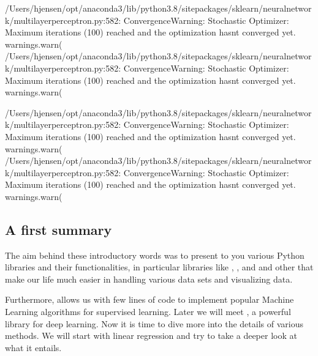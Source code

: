 \documentclass[letterpaper,10pt,english]{sphinxmanual}
\begin{document}
\begin{sphinxVerbatim}[commandchars=\\\{\}]
/Users/hjensen/opt/anaconda3/lib/python3.8/site\PYGZhy{}packages/sklearn/neural\PYGZus{}network/\PYGZus{}multilayer\PYGZus{}perceptron.py:582: ConvergenceWarning: Stochastic Optimizer: Maximum iterations (100) reached and the optimization hasn\PYGZsq{}t converged yet.
  warnings.warn(
/Users/hjensen/opt/anaconda3/lib/python3.8/site\PYGZhy{}packages/sklearn/neural\PYGZus{}network/\PYGZus{}multilayer\PYGZus{}perceptron.py:582: ConvergenceWarning: Stochastic Optimizer: Maximum iterations (100) reached and the optimization hasn\PYGZsq{}t converged yet.
  warnings.warn(
\end{sphinxVerbatim}

\begin{sphinxVerbatim}[commandchars=\\\{\}]
/Users/hjensen/opt/anaconda3/lib/python3.8/site\PYGZhy{}packages/sklearn/neural\PYGZus{}network/\PYGZus{}multilayer\PYGZus{}perceptron.py:582: ConvergenceWarning: Stochastic Optimizer: Maximum iterations (100) reached and the optimization hasn\PYGZsq{}t converged yet.
  warnings.warn(
/Users/hjensen/opt/anaconda3/lib/python3.8/site\PYGZhy{}packages/sklearn/neural\PYGZus{}network/\PYGZus{}multilayer\PYGZus{}perceptron.py:582: ConvergenceWarning: Stochastic Optimizer: Maximum iterations (100) reached and the optimization hasn\PYGZsq{}t converged yet.
  warnings.warn(
\end{sphinxVerbatim}

\noindent{}


\subsection{A first summary}
\label{\detokenize{chapter2:a-first-summary}}
The aim behind these introductory words was to present to you various
Python libraries and their functionalities, in particular libraries like
, ,  and  and other that make our life much easier
in handling various data sets and visualizing data.

Furthermore,
 allows us with few lines of code to implement popular
Machine Learning algorithms for supervised learning. Later we will meet , a powerful library for deep learning.
Now it is time to dive more into the details of various methods. We will start with linear regression and try to take a deeper look at what it entails.
\end{document}
